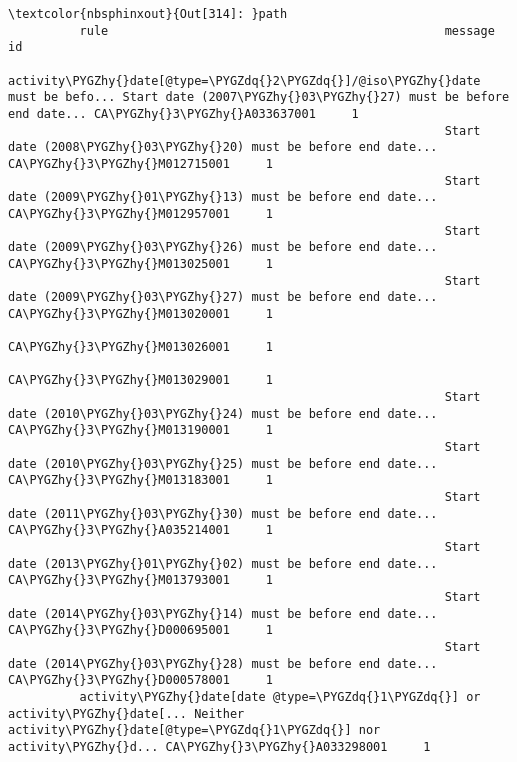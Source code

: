\documentclass[letterpaper,10pt,english]{sphinxmanual}
\begin{document}
\begin{Verbatim}[commandchars=\\\{\}]
\textcolor{nbsphinxout}{Out[314]: }path
          rule                                               message                                            id
          activity\PYGZhy{}date[@type=\PYGZdq{}2\PYGZdq{}]/@iso\PYGZhy{}date must be befo... Start date (2007\PYGZhy{}03\PYGZhy{}27) must be before end date... CA\PYGZhy{}3\PYGZhy{}A033637001     1
                                                             Start date (2008\PYGZhy{}03\PYGZhy{}20) must be before end date... CA\PYGZhy{}3\PYGZhy{}M012715001     1
                                                             Start date (2009\PYGZhy{}01\PYGZhy{}13) must be before end date... CA\PYGZhy{}3\PYGZhy{}M012957001     1
                                                             Start date (2009\PYGZhy{}03\PYGZhy{}26) must be before end date... CA\PYGZhy{}3\PYGZhy{}M013025001     1
                                                             Start date (2009\PYGZhy{}03\PYGZhy{}27) must be before end date... CA\PYGZhy{}3\PYGZhy{}M013020001     1
                                                                                                                CA\PYGZhy{}3\PYGZhy{}M013026001     1
                                                                                                                CA\PYGZhy{}3\PYGZhy{}M013029001     1
                                                             Start date (2010\PYGZhy{}03\PYGZhy{}24) must be before end date... CA\PYGZhy{}3\PYGZhy{}M013190001     1
                                                             Start date (2010\PYGZhy{}03\PYGZhy{}25) must be before end date... CA\PYGZhy{}3\PYGZhy{}M013183001     1
                                                             Start date (2011\PYGZhy{}03\PYGZhy{}30) must be before end date... CA\PYGZhy{}3\PYGZhy{}A035214001     1
                                                             Start date (2013\PYGZhy{}01\PYGZhy{}02) must be before end date... CA\PYGZhy{}3\PYGZhy{}M013793001     1
                                                             Start date (2014\PYGZhy{}03\PYGZhy{}14) must be before end date... CA\PYGZhy{}3\PYGZhy{}D000695001     1
                                                             Start date (2014\PYGZhy{}03\PYGZhy{}28) must be before end date... CA\PYGZhy{}3\PYGZhy{}D000578001     1
          activity\PYGZhy{}date[date @type=\PYGZdq{}1\PYGZdq{}] or activity\PYGZhy{}date[... Neither activity\PYGZhy{}date[@type=\PYGZdq{}1\PYGZdq{}] nor activity\PYGZhy{}d... CA\PYGZhy{}3\PYGZhy{}A033298001     1

\end{Verbatim}
\end{document}
